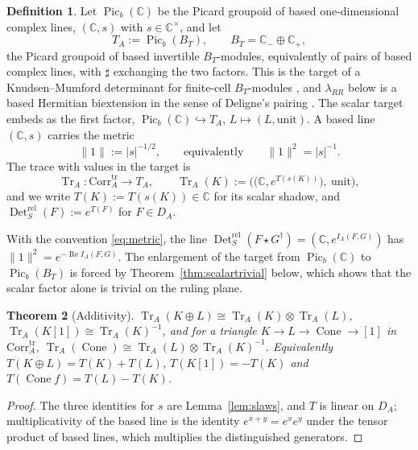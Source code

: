 \documentclass[11pt]{amsart}
\newtheorem{theorem}{Theorem}[section]
\theoremstyle{definition}
\newtheorem{definition}[theorem]{Definition}
\theoremstyle{remark}
\newcommand{\C}{\mathbb C}
\newcommand{\Tr}{\operatorname{Tr}}
\newcommand{\Rel}{\operatorname{Re}}
\newcommand{\Det}{\operatorname{Det}}
\newcommand{\Picb}{\operatorname{Pic}_{b}}
\newcommand{\Cone}{\operatorname{Cone}}
\newcommand{\DA}{D_A}
\newcommand{\Corrtr}{\mathrm{Corr}^{\mathrm{tr}}_{A}}
\newcommand{\BT}{B_T}
\begin{document}
\begin{definition}\label{def:target}
Let $\Picb(\C)$ be the Picard groupoid of based one-dimensional complex lines,
$(\C,s)$ with $s\in\C^{\times}$, and let
\begin{equation}\label{eq:target}
T_A:=\Picb(\BT),\qquad \BT=\C_-\oplus\C_+,
\end{equation}
the Picard groupoid of based invertible $\BT$-modules, equivalently of pairs of
based complex lines, with $\sharp$ exchanging the two factors.  This is the
target of a Knudsen--Mumford determinant for finite-cell $\BT$-modules
\cite{KnudsenMumford}, and $\lambda_{RR}$ below is a based Hermitian
biextension in the sense of Deligne's pairing \cite{Deligne}.  The scalar
target embeds as the first factor, $\Picb(\C)\hookrightarrow T_A$,
$L\mapsto(L,\mathrm{unit})$.  A based line $(\C,s)$ carries the metric
\begin{equation}\label{eq:metric}
\lVert1\rVert:=|s|^{-1/2},\qquad\text{equivalently}\qquad
\lVert1\rVert^{2}=|s|^{-1} .
\end{equation}
The trace with values in the target is
\begin{equation}\label{eq:TrA}
\Tr_A:\Corrtr\to T_A,\qquad
\Tr_A(K):=\bigl(\bigl(\C,e^{T(s(K))}\bigr),\ \mathrm{unit}\bigr),
\end{equation}
and we write $T(K):=T(s(K))\in\C$ for its scalar shadow, and
$\Det^{\mathrm{rel}}_S(F):=e^{T(F)}$ for $F\in\DA$.
\end{definition}

With the convention \eqref{eq:metric}, the line
$\Det^{\mathrm{rel}}_S(F\star G^{\dagger})=(\C,e^{I_A(F,G)})$ has
$\lVert1\rVert^{2}=e^{-\Rel I_A(F,G)}$.  The enlargement of the target from
$\Picb(\C)$ to $\Picb(\BT)$ is forced by Theorem~\ref{thm:scalartrivial}
below, which shows that the scalar factor alone is trivial on the ruling plane.

\begin{theorem}[Additivity]\label{thm:additivity}
$\Tr_A(K\oplus L)\cong\Tr_A(K)\otimes\Tr_A(L)$,
$\Tr_A(K[1])\cong\Tr_A(K)^{-1}$, and for a triangle $K\to L\to\Cone\to[1]$ in
$\Corrtr$, $\Tr_A(\Cone)\cong\Tr_A(L)\otimes\Tr_A(K)^{-1}$.  Equivalently
$T(K\oplus L)=T(K)+T(L)$, $T(K[1])=-T(K)$ and $T(\Cone f)=T(L)-T(K)$.
\end{theorem}

\begin{proof}
The three identities for $s$ are Lemma~\ref{lem:slaws}, and $T$ is linear on
$\DA$; multiplicativity of the based line is the identity
$e^{x+y}=e^{x}e^{y}$ under the tensor product of based lines, which multiplies
the distinguished generators.
\end{proof}
\end{document}
